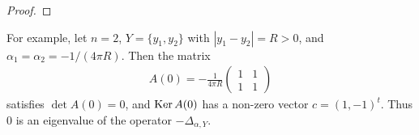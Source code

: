 \documentclass[12pt,a4paper]{article}
\def\Ker{\mathop{\rm Ker}\nolimits}
\begin{document}
\begin{proof}
%
%
%
\end{proof}
For example, let $n=2$,
$Y=\{y_1,y_2\}$ with $|y_1-y_2|=R>0$,
and $\alpha_1=\alpha_2=-1/(4\pi R)$.
Then the matrix
\begin{align*}
 A(0)
=-\frac{1}{4\pi R}
\begin{pmatrix}
 1 & 1\\ 1 & 1
\end{pmatrix}
\end{align*}
satisfies $\det A(0)=0$,
and $\Ker A(0)$ has a non-zero vector $c=(1,-1)^{t}$.
Thus $0$ is an eigenvalue of the operator $-\Delta_{\alpha,Y}$.
\end{document}
